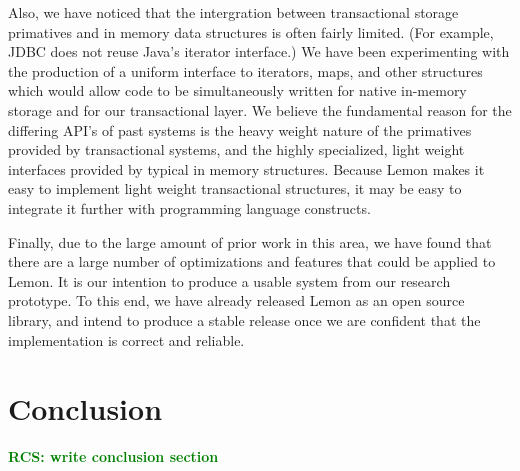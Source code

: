 \documentclass[letterpaper,twocolumn,english]{article}
\newcommand{\yad}{Lemon\xspace}
\newcommand{\rcs}[1]{\textcolor{green}{\bf RCS: #1}}
\begin{document}
Also, we have noticed that the intergration between transactional
storage primatives and in memory data structures is often fairly
limited.  (For example, JDBC does not reuse Java's iterator
interface.)  We have been experimenting with the production of a
uniform interface to iterators, maps, and other structures which would
allow code to be simultaneously written for native in-memory storage
and for our transactional layer.  We believe the fundamental reason
for the differing API's of past systems is the heavy weight nature of
the primatives provided by transactional systems, and the highly
specialized, light weight interfaces provided by typical in memory
structures.  Because \yad makes it easy to implement light weight
transactional structures, it may be easy to integrate it further with
programming language constructs.

Finally, due to the large amount of prior work in this area, we have
found that there are a large number of optimizations and features that
could be applied to \yad.  It is our intention to produce a usable
system from our research prototype.  To this end, we have already
released \yad as an open source library, and intend to produce a
stable release once we are confident that the implementation is correct
and reliable.  


\section{Conclusion}

\rcs{write conclusion section}
\end{document}
